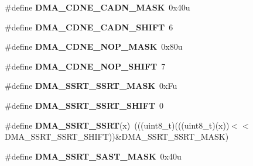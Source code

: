 \begin{DoxyCompactItemize}
\item 
\#define {\bfseries D\+M\+A\+\_\+\+C\+D\+N\+E\+\_\+\+C\+A\+D\+N\+\_\+\+M\+A\+SK}~0x40u\hypertarget{group__DMA__Register__Masks_gae1c134ccb3874e42a53d9294e1b1366c}{}\label{group__DMA__Register__Masks_gae1c134ccb3874e42a53d9294e1b1366c}

\item 
\#define {\bfseries D\+M\+A\+\_\+\+C\+D\+N\+E\+\_\+\+C\+A\+D\+N\+\_\+\+S\+H\+I\+FT}~6\hypertarget{group__DMA__Register__Masks_ga45fa14dce342a18cb1ea15705a772671}{}\label{group__DMA__Register__Masks_ga45fa14dce342a18cb1ea15705a772671}

\item 
\#define {\bfseries D\+M\+A\+\_\+\+C\+D\+N\+E\+\_\+\+N\+O\+P\+\_\+\+M\+A\+SK}~0x80u\hypertarget{group__DMA__Register__Masks_ga8f22bcbf69b1598d53d60b7667079655}{}\label{group__DMA__Register__Masks_ga8f22bcbf69b1598d53d60b7667079655}

\item 
\#define {\bfseries D\+M\+A\+\_\+\+C\+D\+N\+E\+\_\+\+N\+O\+P\+\_\+\+S\+H\+I\+FT}~7\hypertarget{group__DMA__Register__Masks_gaa6e57536846087bab95bfb2f8895f626}{}\label{group__DMA__Register__Masks_gaa6e57536846087bab95bfb2f8895f626}

\item 
\#define {\bfseries D\+M\+A\+\_\+\+S\+S\+R\+T\+\_\+\+S\+S\+R\+T\+\_\+\+M\+A\+SK}~0x\+Fu\hypertarget{group__DMA__Register__Masks_gad3b3959cb4d1e1db5bbb4cc6291a0390}{}\label{group__DMA__Register__Masks_gad3b3959cb4d1e1db5bbb4cc6291a0390}

\item 
\#define {\bfseries D\+M\+A\+\_\+\+S\+S\+R\+T\+\_\+\+S\+S\+R\+T\+\_\+\+S\+H\+I\+FT}~0\hypertarget{group__DMA__Register__Masks_gacdadd55124a59d83a6b26976e85fb0ff}{}\label{group__DMA__Register__Masks_gacdadd55124a59d83a6b26976e85fb0ff}

\item 
\#define {\bfseries D\+M\+A\+\_\+\+S\+S\+R\+T\+\_\+\+S\+S\+RT}(x)~(((uint8\+\_\+t)(((uint8\+\_\+t)(x))$<$$<$D\+M\+A\+\_\+\+S\+S\+R\+T\+\_\+\+S\+S\+R\+T\+\_\+\+S\+H\+I\+FT))\&D\+M\+A\+\_\+\+S\+S\+R\+T\+\_\+\+S\+S\+R\+T\+\_\+\+M\+A\+SK)\hypertarget{group__DMA__Register__Masks_ga381ae16ec1d637479a855f345d3e160f}{}\label{group__DMA__Register__Masks_ga381ae16ec1d637479a855f345d3e160f}

\item 
\#define {\bfseries D\+M\+A\+\_\+\+S\+S\+R\+T\+\_\+\+S\+A\+S\+T\+\_\+\+M\+A\+SK}~0x40u\hypertarget{group__DMA__Register__Masks_gadcecaad6474bd238180952527a63130b}{}\label{group__DMA__Register__Masks_gadcecaad6474bd238180952527a63130b}


\end{DoxyCompactItemize}
